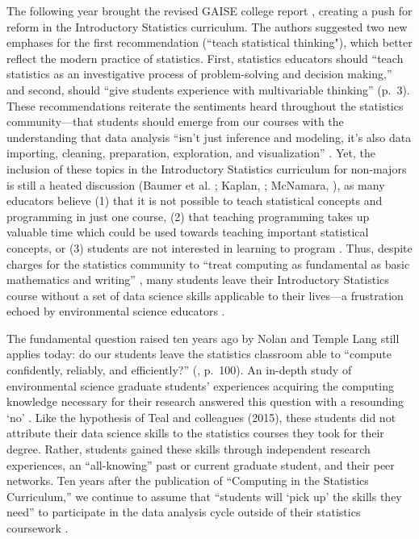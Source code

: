 \documentclass[12pt]{article}
\begin{document}
\quad The following year brought the revised GAISE college report 
\citep{gaise}, creating a push for reform in the Introductory Statistics 
curriculum. The authors suggested two new emphases for the first recommendation
(``teach statistical thinking"), which better reflect the modern practice of
statistics. First, statistics educators should ``teach statistics as
an investigative process of problem-solving and decision making,'' and second,
should ``give students experience with multivariable thinking'' 
(p.\ 3). These recommendations reiterate the sentiments heard
throughout the statistics community---that students should emerge from our
courses with the understanding that data analysis ``isn't just inference and
modeling, it's also data importing, cleaning, preparation, exploration, and
visualization'' \citep{mine-jsm}. Yet, the inclusion of these topics in the
Introductory Statistics curriculum for non-majors is still a heated
discussion (Baumer et al. \citeyear{horton_takingachance}; Kaplan, 
\citeyear{kaplan}; McNamara, \citeyear{mcnamara}), as many educators believe
(1) that it is not possible to teach statistical concepts and programming in
just one course, (2) that teaching programming takes up valuable time which
could be used towards teaching important statistical concepts, or (3) students
are not interested in learning to program \citep{mine-jsm}. Thus, despite
charges for the statistics community to ``treat computing as fundamental as
basic mathematics and writing'' \citep[p.\ 298]{esr}, many students leave their
Introductory Statistics course without a set of data science skills applicable
to their lives---a frustration echoed by environmental science educators 
\citep{hampton, carpentry}. 

\quad The fundamental question raised 
ten years ago by Nolan and Temple Lang still applies today: do our students
leave the statistics classroom able to ``compute confidently, reliably, and
efficiently?'' (\citeyear{nolan}, p.\ 100). An in-depth study of environmental 
science graduate students' experiences acquiring the computing knowledge
necessary for their research answered this question with a resounding `no' 
\citep{theobold}. Like the hypothesis of Teal and colleagues (2015), these
students did not attribute their data science skills to the statistics courses
they took for their degree. Rather, students gained these skills through
independent research experiences, an ``all-knowing'' past or current graduate
student, and their peer networks. Ten years after the publication of 
``Computing in the Statistics Curriculum,'' we continue to assume that 
``students will `pick up' the skills they need'' to participate in the data
analysis cycle outside of their statistics coursework \citep[p.\ 309]{gould}. 
\end{document}

